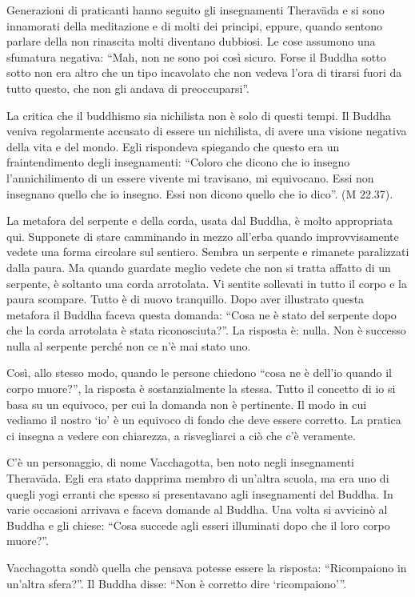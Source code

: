 Generazioni di praticanti hanno seguito gli insegnamenti Theravāda e si sono innamorati della meditazione e di molti dei principi, eppure, quando sentono parlare della non rinascita molti diventano dubbiosi. Le cose assumono una sfumatura negativa: ``Mah, non ne sono poi così sicuro. Forse il Buddha sotto sotto non era altro che un tipo incavolato che non vedeva l'ora di tirarsi fuori da tutto questo, che non gli andava di preoccuparsi''.

La critica che il buddhismo sia nichilista non è solo di questi tempi. Il Buddha veniva regolarmente accusato di essere un nichilista, di avere una visione negativa della vita e del mondo. Egli rispondeva spiegando che questo era un fraintendimento degli insegnamenti: ``Coloro che dicono che io insegno l'annichilimento di un essere vivente mi travisano, mi equivocano. Essi non insegnano quello che io insegno. Essi non dicono quello che io dico''. (M 22.37).

La metafora del serpente e della corda, usata dal Buddha, è molto appropriata qui. Supponete di stare camminando in mezzo all'erba quando improvvisamente vedete una forma circolare sul sentiero. Sembra un serpente e rimanete paralizzati dalla paura. Ma quando guardate meglio vedete che non si tratta affatto di un serpente, è soltanto una corda arrotolata. Vi sentite sollevati in tutto il corpo e la paura scompare. Tutto è di nuovo tranquillo. Dopo aver illustrato questa metafora il Buddha faceva questa domanda: ``Cosa ne è stato del serpente dopo che la corda arrotolata è stata riconosciuta?''. La risposta è: nulla. Non è successo nulla al serpente perché non ce n'è mai stato uno. 

Così, allo stesso modo, quando le persone chiedono ``cosa ne è dell'io quando il corpo muore?'', la risposta è sostanzialmente la stessa. Tutto il concetto di io si basa su un equivoco, per cui la domanda non è pertinente. Il modo in cui vediamo il nostro `io' è un equivoco di fondo che deve essere corretto. La pratica ci insegna a vedere con chiarezza, a risvegliarci a ciò che c'è veramente. 

C'è un personaggio, di nome Vacchagotta, ben noto negli insegnamenti Theravāda. Egli era stato dapprima membro di un'altra scuola, ma era uno di quegli yogi erranti che spesso si presentavano agli insegnamenti del Buddha. In varie occasioni arrivava e faceva domande al Buddha. Una volta si avvicinò al Buddha e gli chiese: ``Cosa succede agli esseri illuminati dopo che il loro corpo muore?''.

Vacchagotta sondò quella che pensava potesse essere la risposta: ``Ricompaiono in un'altra sfera?''. Il Buddha disse: ``Non è corretto dire `ricompaiono'\thinspace''.

